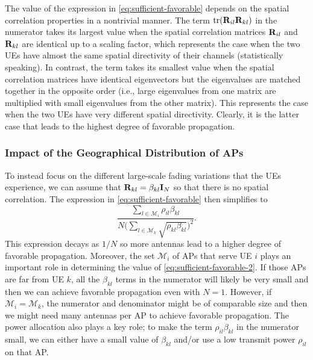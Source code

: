 The value of the expression in \eqref{eq:sufficient-favorable} depends on the spatial correlation properties in a nontrivial manner. The term $\mathrm{tr} ( \mathbf{R}_{il} \mathbf{R}_{kl} )$ in the numerator takes its largest value when the spatial correlation matrices $\mathbf{R}_{il}$ and $\mathbf{R}_{kl}$ are identical up to a scaling factor, which represents the case when the two UEs have almost the same spatial directivity of their channels (statistically speaking).
In contrast, the term takes its smallest value when  the spatial correlation matrices have identical eigenvectors but the eigenvalues are matched together in the opposite order (i.e., large eigenvalues from one matrix are multiplied with small eigenvalues from the other matrix). This represents the case when the two UEs have very different spatial directivity. Clearly, it is the latter case that leads to the highest degree of favorable propagation.

\subsubsection{Impact of the Geographical Distribution of APs}

To instead focus on the different large-scale fading variations that the UEs experience, we can assume that $\mathbf{R}_{kl} = \beta_{kl} \mathbf{I}_N$ so that there is no spatial correlation. The expression in \eqref{eq:sufficient-favorable} then simplifies to
\begin{equation} \label{eq:sufficient-favorable-2}
\frac{ \sum\limits_{l \in \mathcal{M}_i} \rho_{il} \beta_{kl} 
}{ N \bigg( \sum\limits_{l \in \mathcal{M}_k} \sqrt{\rho_{kl}  \beta_{kl}} 
\bigg)^2 } .
\end{equation}
This expression decays as $1/N$ so more antennas lead to a higher degree of favorable propagation. Moreover, the set $\mathcal{M}_i$ of APs that serve UE $i$ plays an important role in determining the value of \eqref{eq:sufficient-favorable-2}. If those APs are far from UE $k$, all the $\beta_{kl} $ terms in the numerator will likely be very small and then we can achieve favorable propagation even with $N=1$. However, if $\mathcal{M}_i = \mathcal{M}_k$, the numerator and denominator might be of comparable size and then we might need many antennas per AP to achieve favorable propagation.
The power allocation also plays a key role; to make the term $ \rho_{il} \beta_{kl} $ in the numerator small, we can either have a small value of $\beta_{kl} $ and/or use a low transmit power $ \rho_{il}$ on that AP.


